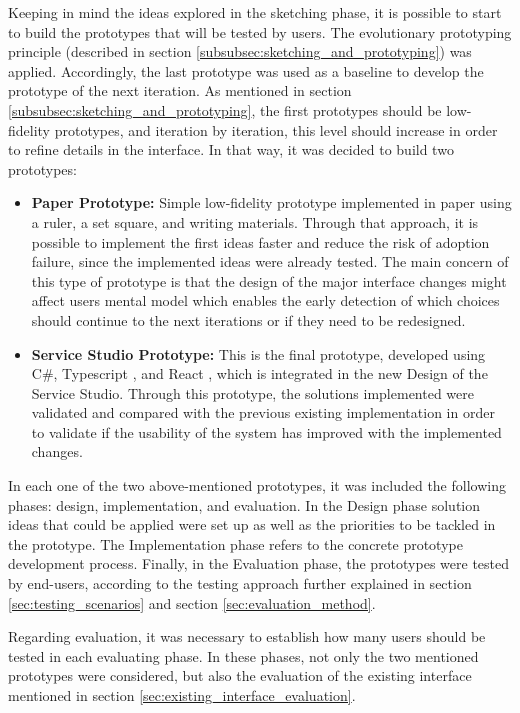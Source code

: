 Keeping in mind the ideas explored in the sketching phase, it is possible to start to build the prototypes that will be tested by users. The evolutionary prototyping principle (described in section \ref{subsubsec:sketching_and_prototyping}) was applied. Accordingly, the last prototype was used as a baseline to develop the prototype of the next iteration. As mentioned in section \ref{subsubsec:sketching_and_prototyping}, the first prototypes should be low-fidelity prototypes, and iteration by iteration, this level should increase in order to refine details in the interface. In that way, it was decided to build two prototypes:

\begin{itemize}
    \item \textbf{Paper Prototype: } Simple low-fidelity prototype implemented in paper using a ruler, a set square, and writing materials. Through that approach, it is possible to implement the first ideas faster and reduce the risk of adoption failure, since the implemented ideas were already tested. The main concern of this type of prototype is that the design of the major interface changes might affect users mental model which enables the early detection of which choices should continue to the next iterations or if they need to be redesigned.
    \item \textbf{Service Studio Prototype: } This is the final prototype, developed using C\#, Typescript \cite{typescript}, and React \cite{react}, which is integrated in the new Design of the Service Studio. Through this prototype, the solutions implemented were validated and compared with the previous existing implementation in order to validate if the usability of the system has improved with the implemented changes.
\end{itemize}

In each one of the two above-mentioned prototypes, it was included the following phases: design, implementation, and evaluation. In the Design phase solution ideas that could be applied were set up as well as the priorities to be tackled in the prototype. The Implementation phase refers to the concrete prototype development process. Finally, in the Evaluation phase, the prototypes were tested by end-users, according to the testing approach further explained in section \ref{sec:testing_scenarios} and section \ref{sec:evaluation_method}.

Regarding evaluation, it was necessary to establish how many users should be tested in each evaluating phase. In these phases, not only the two mentioned prototypes were considered, but also the evaluation of the existing interface mentioned in section \ref{sec:existing_interface_evaluation}. 

